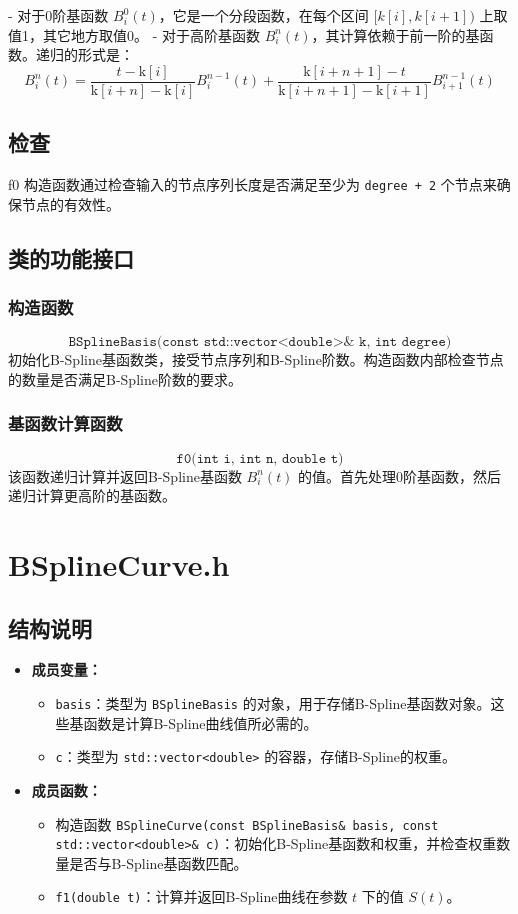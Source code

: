 \documentclass[a4paper]{article}
\begin{document}
- 对于0阶基函数 \( B_i^0(t) \)，它是一个分段函数，在每个区间 \([k[i], k[i+1])\) 上取值1，其它地方取值0。
- 对于高阶基函数 \( B_i^n(t) \)，其计算依赖于前一阶的基函数。递归的形式是：
\[
B_i^n(t) = \frac{t - \text{k}[i]}{\text{k}[i+n] - \text{k}[i]} B_i^{n-1}(t) + \frac{\text{k}[i+n+1] - t}{\text{k}[i+n+1] - \text{k}[i+1]} B_{i+1}^{n-1}(t)
\]

\subsection{检查}
f0
构造函数通过检查输入的节点序列长度是否满足至少为 \texttt{degree + 2} 个节点来确保节点的有效性。

\subsection{类的功能接口}

\subsubsection{构造函数}

\[
\texttt{BSplineBasis(const std::vector<double>& k, int degree)}
\]
初始化B-Spline基函数类，接受节点序列和B-Spline阶数。构造函数内部检查节点的数量是否满足B-Spline阶数的要求。

\subsubsection{基函数计算函数}

\[
\texttt{f0(int i, int n, double t)}
\]
该函数递归计算并返回B-Spline基函数 \( B_i^n(t) \) 的值。首先处理0阶基函数，然后递归计算更高阶的基函数。

\section{BSplineCurve.h}
\subsection{结构说明}
\begin{itemize}
    \item \textbf{成员变量：}
    \begin{itemize}
        \item \texttt{basis}：类型为 \texttt{BSplineBasis} 的对象，用于存储B-Spline基函数对象。这些基函数是计算B-Spline曲线值所必需的。
        \item \texttt{c}：类型为 \texttt{std::vector<double>} 的容器，存储B-Spline的权重。
    \end{itemize}
    \item \textbf{成员函数：}
    \begin{itemize}
        \item 构造函数 \texttt{BSplineCurve(const BSplineBasis\& basis, const std::vector<double>\& c)}：初始化B-Spline基函数和权重，并检查权重数量是否与B-Spline基函数匹配。
        \item \texttt{f1(double t)}：计算并返回B-Spline曲线在参数 \( t \) 下的值 \( S(t) \)。
    \end{itemize}
\end{itemize}
\end{document}
